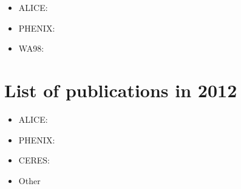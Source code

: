 \documentclass[12pt]{article}
\begin{document}
\begin{itemize}
\item ALICE:
\cite{
Abelev:2012sq,
ALICE:2012xs,
Abelev:2012sea,
Abelev:2012sca,
Abelev:2012pv,
Abelev:2012pa,
Abelev:2012di,
Abelev:2013xaa,
ABELEV:2013wsa,
Abelev:2013sqa,
Abelev:2013bla,
Abelev:2013ala,
Abelev:2013cva,
Abbas:2013taa,
Abelev:2013lca,
Abbas:2013rua,
Abbas:2013oua,
Abbas:2013bpa,
ALICE:2013xna,
Abelev:2013vea,
Abelev:2013qoq,
Abelev:2013csa,
Abelev:2013fn,
Abelev:2012ola,
ALICE:2012mj,
Abelev:2012ba,
Abelev:2012hxa}

\item PHENIX:
\cite{
Adare:2012bv,
Adare:2012vv,
Adare:2013wop,
Adare:2013ezl,
Adare:2013esx,
Adare:2013piz,
Adare:2012qi,
Adare:2012vw,
Adare:2012wg,
Adare:2012qf}


\item WA98:
\cite{Aggarwal:2011ns}

\end{itemize}

\section{List of publications in 2012}

\begin{itemize}
\item ALICE:
\cite{
Abelev:2012ej,
ALICE:2011ac,
ALICE:2011aa,
Abelev:2011md,
Aamodt:2011vg,
Abelev:2012hy,
Abelev:2012wca,
Abelev:2012tca,
Abelev:2012ms,
Abelev:2012qh,
Abelev:2012gx,
Abelev:2012cn,
Abelev:2012xe,
Abelev:2012vra,
Abelev:2012sk,
Abelev:2012jp,
Abelev:2012kr,
ALICE:2012aa,
ALICE:2012ab,
Abelev:2012rz,
Abelev:2012rv,
Abelev:2012pi,
ALICE:2011ad,
Aamodt:2011by}
%

\item PHENIX:
\cite{
Adare:2012wf,
Afanasiev:2012dg,
Adare:2012yt,
Adare:2012uk,
Adare:2012px,
Adare:2012vq,
Adare:2012nq,
Adare:2011zr,
Adare:2011vq}


\item CERES:
\cite{Adamova:2012md}

\item Other
\cite{Kral:2012ae}

\end{itemize}
\end{document}

